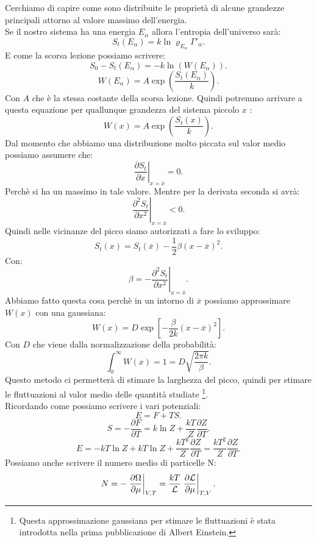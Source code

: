Cerchiamo di capire come sono distribuite le proprietà di alcune grandezze principali attorno al valore massimo dell'energia. \\
Se il nostro sistema ha una energia $E_{\alpha}$ allora l'entropia dell'universo sarà:
\[
	S_{t}\left( E_{\alpha} \right) = k \ln \varrho_{E_{\alpha}} \Gamma'_{\alpha}
.\] 
E come la scorsa lezione possiamo scrivere:
\[
	S_0-S_{t}\left( E_{\alpha} \right) = -k \ln\left( W\left( E_{\alpha} \right)  \right) 
.\] 
\[
	W\left( E_{\alpha} \right) = A \exp \left( \frac{S_{t}\left( E_{\alpha} \right) }{k} \right) 
.\] 
Con $A$ che è la stessa costante della scorsa lezione. Quindi potremmo arrivare a questa equazione per quallunque grandezza del sistema piccolo $x$ :
\[
	W\left( x \right) = A \exp\left( \frac{S_{t}\left( x \right) }{k} \right) 
.\] 
Dal momento che abbiamo una distribuzione molto piccata sul valor medio possiamo assumere che:
\[
	\left.\frac{\partial S_{t}}{\partial x} \right|_{x = \overline{x}}=0
.\] 
Perchè si ha un massimo in tale valore. Mentre per la derivata seconda si avrà:
\[
	\left.\frac{\partial ^2 S_{t}}{\partial x^2 } \right|_{x = \overline{x}} < 0
.\] 
Quindi nelle vicinanze del picco siamo autorizzati a fare lo sviluppo:
\[
	S_{t}\left( x \right) = S_{t}\left( \overline{x} \right) - \frac{1}{2} \beta \left( x - \overline{x} \right) ^2
.\] 
Con:
\[
	\beta = - \left.\frac{\partial ^2 S_{t}}{\partial x^2} \right|_{x =\overline{x}}
.\] 
Abbiamo fatto questa cosa perchè in un intorno di $\overline{x}$ possiamo approssimare $W\left( x \right) $ con una gaussiana:
\[
	W\left( x \right) = D \exp \left[ - \frac{\beta}{2k} \left( x - \overline{x} \right) ^2\right] 
.\] \label{eq:Gauss-approx} 
Con $D$ che viene dalla normalizzazione della probabilità:
\[
	\int_{0}^{\infty} W\left( x \right) = 1  = D \sqrt{\frac{2\pi k}{\beta}} 
.\] 
Questo metodo ci permetterà di stimare la larghezza del picco, quindi per stimare le fluttuazioni al valor medio delle quantità studiate \footnote{Questa approssimazione gaussiana per stimare le fluttuazioni è stata introdotta nella prima pubblicazione di Albert Einstein.}.\\
Ricordando come possiamo scrivere i vari potenziali:
\[
	E = F +TS
.\] 
\[
	S = - \frac{\partial F}{\partial T} = k \ln Z + \frac{kT}{Z}\frac{\partial Z}{\partial T} 
.\] 
\[
	E = -kT \ln Z + kT \ln Z + \frac{kT^2}{Z} \frac{\partial Z}{\partial T} = \frac{kT^2}{Z}\frac{\partial Z}{\partial T} 
.\] 
Possiamo anche scrivere il numero medio di particelle N:
\[
	N = - \left.\frac{\partial \Omega}{\partial \mu}\right|_{V,T} = \frac{kT}{\mathcal{L}} \left.\frac{\partial \mathcal{L}}{\partial \mu} \right|_{T,V} 
.\] 

